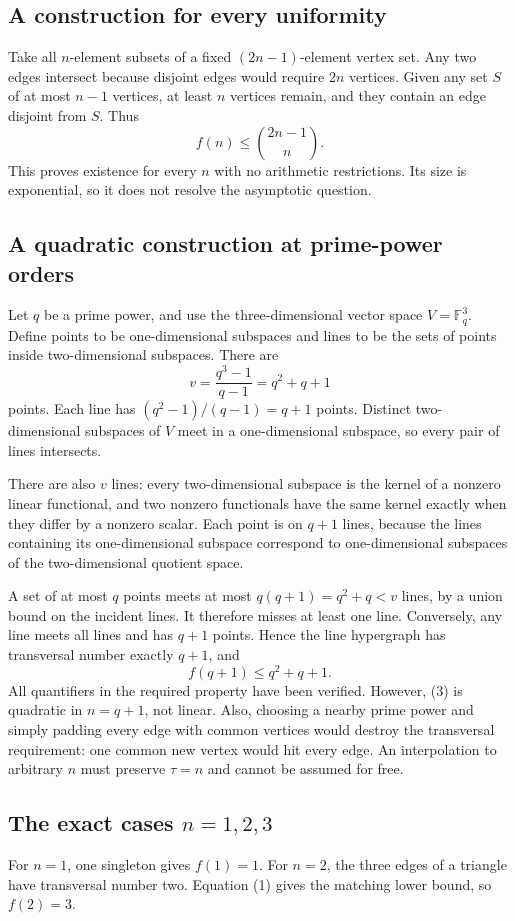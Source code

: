 \subsection{A construction for every uniformity}
Take all $n$-element subsets of a fixed $(2n-1)$-element vertex set. Any two edges intersect because disjoint edges would require $2n$ vertices. Given any set $S$ of at most $n-1$ vertices, at least $n$ vertices remain, and they contain an edge disjoint from $S$. Thus
\[
 f(n)\le\binom{2n-1}{n}.
\tag{2}
\]
This proves existence for every $n$ with no arithmetic restrictions. Its size is exponential, so it does not resolve the asymptotic question.

\subsection{A quadratic construction at prime-power orders}
Let $q$ be a prime power, and use the three-dimensional vector space $V=\mathbb F_q^3$. Define points to be one-dimensional subspaces and lines to be the sets of points inside two-dimensional subspaces. There are
\[
 v=\frac{q^3-1}{q-1}=q^2+q+1
\]
points. Each line has $(q^2-1)/(q-1)=q+1$ points. Distinct two-dimensional subspaces of $V$ meet in a one-dimensional subspace, so every pair of lines intersects.

There are also $v$ lines: every two-dimensional subspace is the kernel of a nonzero linear functional, and two nonzero functionals have the same kernel exactly when they differ by a nonzero scalar. Each point is on $q+1$ lines, because the lines containing its one-dimensional subspace correspond to one-dimensional subspaces of the two-dimensional quotient space.

A set of at most $q$ points meets at most $q(q+1)=q^2+q<v$ lines, by a union bound on the incident lines. It therefore misses at least one line. Conversely, any line meets all lines and has $q+1$ points. Hence the line hypergraph has transversal number exactly $q+1$, and
\[
 f(q+1)\le q^2+q+1.
\tag{3}
\]
All quantifiers in the required property have been verified. However, (3) is quadratic in $n=q+1$, not linear. Also, choosing a nearby prime power and simply padding every edge with common vertices would destroy the transversal requirement: one common new vertex would hit every edge. An interpolation to arbitrary $n$ must preserve $\tau=n$ and cannot be assumed for free.

\subsection{The exact cases $n=1,2,3$}
For $n=1$, one singleton gives $f(1)=1$. For $n=2$, the three edges of a triangle have transversal number two. Equation (1) gives the matching lower bound, so $f(2)=3$.

